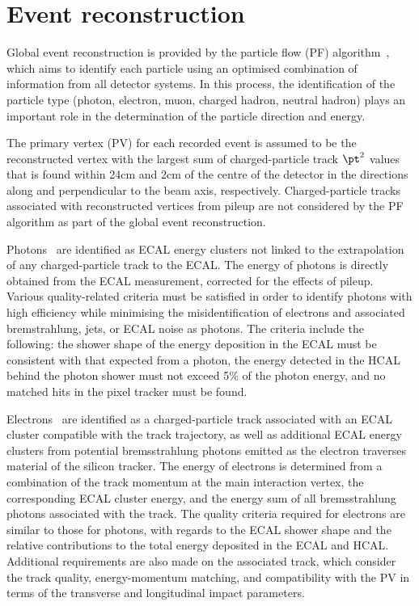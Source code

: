 \section{Event reconstruction}
\label{sec:event_reconstruction}

Global event reconstruction is provided by the particle flow (PF)
algorithm~\cite{CMS-PAS-PFT-09-001,CMS-PAS-PFT-10-001}, which aims to
identify each particle using an optimised combination of information
from all detector systems. In this process, the identification of the
particle type (photon, electron, muon, charged hadron, neutral hadron)
plays an important role in the determination of the particle
direction and energy.

The primary vertex (PV) for each recorded event is assumed to be the
reconstructed vertex with the largest sum of charged-particle track
$\pt^2$ values that is found within 24\unit{cm} and 2\unit{cm} of the
centre of the detector in the directions along and perpendicular to
the beam axis, respectively. Charged-particle tracks associated with
reconstructed vertices from pileup are not considered by the PF
algorithm as part of the global event reconstruction.

Photons~\cite{CMS:EGM-14-001} are identified as ECAL energy clusters
not linked to the extrapolation of any charged-particle track to the
ECAL. The energy of photons is directly obtained from the ECAL
measurement, corrected for the effects of pileup. 
Various quality-related criteria must be satisfied in order to
identify photons with high efficiency while minimising the
misidentification of electrons and associated bremstrahlung, jets, 
or ECAL noise as photons. The criteria include the following: the
shower shape of the energy deposition in the ECAL must be consistent
with that expected from a photon, the energy detected in the HCAL
behind the photon shower must not exceed 5\% of the photon energy, and
no matched hits in the pixel tracker must be found. 

Electrons~\cite{Khachatryan:2015hwa} are identified as a
charged-particle track associated with an ECAL cluster compatible with
the track trajectory, as well as additional ECAL energy clusters from
potential bremsstrahlung photons emitted as the electron traverses
material of the silicon tracker. The energy of electrons is determined
from a combination of the track momentum at the main interaction
vertex, the corresponding ECAL cluster energy, and the energy sum of
all bremsstrahlung photons associated with the track. The quality
criteria required for electrons are similar to those for photons, with
regards to the ECAL shower shape and the relative contributions to the
total energy deposited in the ECAL and HCAL. Additional requirements
are also made on the associated track, which consider the track
quality, energy-momentum matching, and compatibility with the PV in
terms of the transverse and longitudinal impact parameters.


